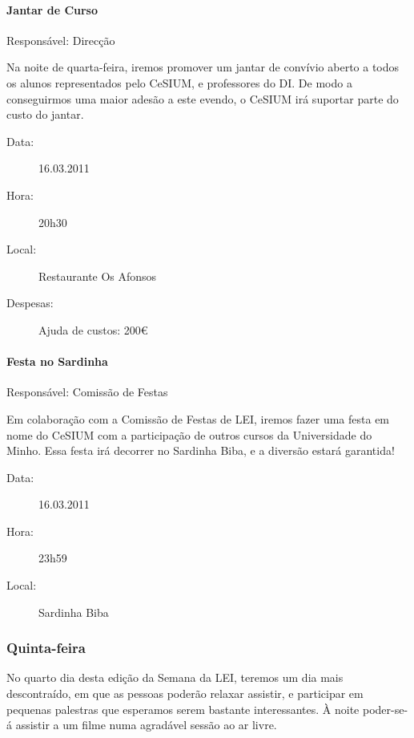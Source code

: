 
\paragraph{Jantar de Curso}
Responsável: Direcção

Na noite de quarta-feira, iremos promover um jantar de convívio aberto a todos os alunos representados pelo CeSIUM, e professores do DI. De modo a conseguirmos uma maior adesão a este evendo, o CeSIUM irá suportar parte do custo do jantar.

\begin{description}
	\item[Data:] 16.03.2011
	\item[Hora:] 20h30
	\item[Local:] Restaurante Os Afonsos
	\item[Despesas:] Ajuda de custos: 200\euro
\end{description}


\paragraph{Festa no Sardinha}
Responsável: Comissão de Festas

Em colaboração com a Comissão de Festas de LEI, iremos fazer uma festa em nome do CeSIUM com a participação de outros cursos da Universidade do Minho. Essa festa irá decorrer no Sardinha Biba, e a diversão estará garantida!

\begin{description}
	\item[Data:] 16.03.2011
	\item[Hora:] 23h59
	\item[Local:] Sardinha Biba
\end{description}


\subsubsection*{Quinta-feira}
No quarto dia desta edição da Semana da LEI, teremos um dia mais descontraído, em que as pessoas poderão relaxar assistir, e participar em pequenas palestras que esperamos serem bastante interessantes. À noite poder-se-á assistir a um filme numa agradável sessão ao ar livre.


